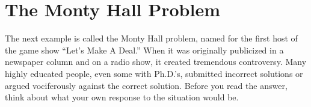\documentclass[11pt,a4paper]{book}
\begin{document}
\begin{example}
\end{example}

\newpage{}

\section{The Monty Hall Problem}

The next example is called the Monty Hall problem, named for the first
host of the game show \textquotedblleft Let\textquoteright s Make
A Deal.\textquotedblright{} When it was originally publicized in a
newspaper column and on a radio show, it created tremendous controversy.
Many highly educated people, even some with Ph.D.\textquoteright s,
submitted incorrect solutions or argued vociferously against the correct
solution. Before you read the answer, think about what your own response
to the situation would be.
\end{document}
